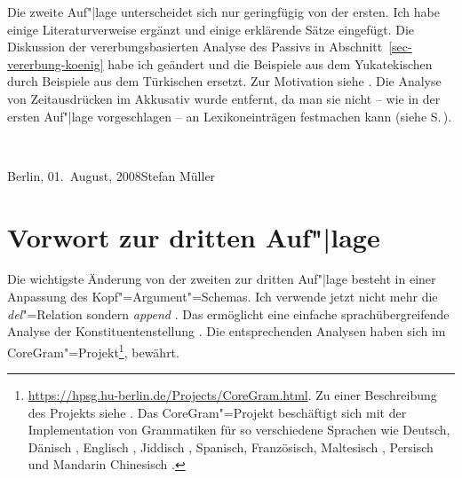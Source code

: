 Die zweite Auf"|lage unterscheidet sich nur geringfügig von der ersten. Ich habe einige
Literaturverweise ergänzt und einige erklärende Sätze eingefügt. Die Diskussion der
vererbungsbasierten Analyse des Passivs in Abschnitt~\ref{sec-vererbung-koenig} habe ich geändert und
die Beispiele aus dem Yukatekischen durch Beispiele aus dem Türkischen
ersetzt. Zur Motivation siehe . Die Analyse von Zeitausdrücken im
Akkusativ wurde entfernt, da man sie nicht -- wie in der ersten Auf"|lage vorgeschlagen -- an Lexikoneinträgen festmachen kann 
(siehe S.\,\pageref{bsp-den-groessten-Teil-der-Woche}).


~\medskip

\noindent
Berlin, 01.\ August, 2008\hfill Stefan Müller

\section*{Vorwort zur dritten Auf"|lage}

Die wichtigste Änderung von der zweiten zur dritten Auf"|lage besteht in einer Anpassung des
Kopf"=Argument"=Schemas. Ich verwende jetzt nicht mehr die \emph{del}"=Relation sondern
\emph{append} \citep[Abschnitt~8.4]{MuellerGTBuch1}. Das ermöglicht eine einfache sprachübergreifende Analyse der Konstituentenstellung
\parencites[228]{MuellerPredication}{MuellerCopula}. Die entsprechenden Analysen haben sich im CoreGram"=Projekt\footnote{
  \url{https://hpsg.hu-berlin.de/Projects/CoreGram.html}. Zu einer Beschreibung des Projekts siehe . Das CoreGram"=Projekt beschäftigt sich mit der Implementation von Grammatiken für so
verschiedene Sprachen wie Deutsch, Dänisch
\citep{MOe2011a,MuellerPredication,MuellerCopula,MOe2013a,MOeDanish}, Englisch
\citep{MuellerPredication,MuellerCopula,MOe2013a,MuellerLFGphrasal}, Jiddisch \citep{MOe2011a}, Spanisch, Französisch,
Maltesisch \citep{MuellerMalteseSketch},
Persisch \citep{MuellerPersian,MG2010a} und Mandarin Chinesisch \citep{Lipenkova2009a,ML2009a,Lu2021a,LM2027a}.
}, bewährt. 

